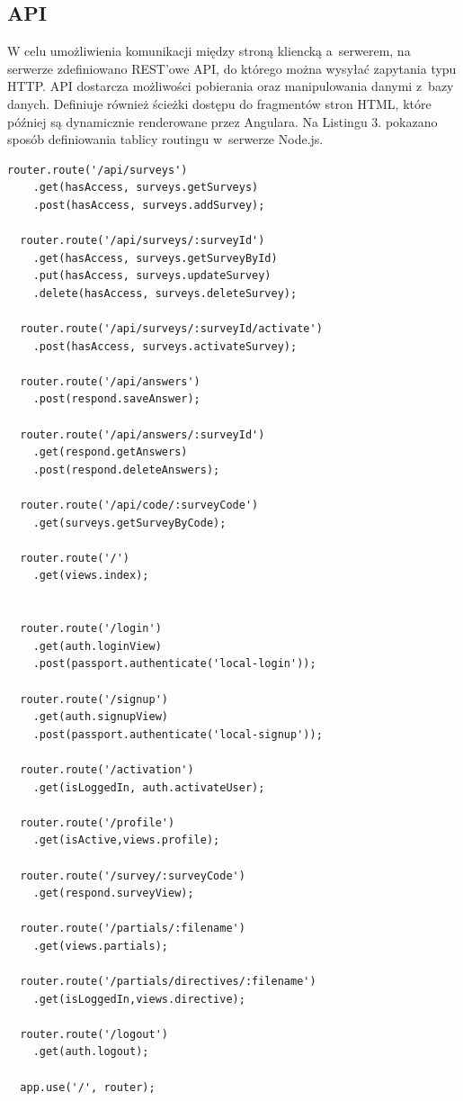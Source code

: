 \documentclass[12pt,a4paper,notitlepage]{article}
\begin{document}
\subsection{API}
W celu umożliwienia komunikacji między stroną kliencką a~serwerem, na serwerze zdefiniowano REST'owe API, do którego można wysyłać zapytania typu HTTP. API dostarcza możliwości pobierania oraz manipulowania danymi z~bazy danych. Definiuje również ścieżki dostępu do fragmentów stron HTML, które później są dynamicznie renderowane przez Angulara. Na Listingu 3. pokazano sposób definiowania tablicy routingu w~serwerze Node.js.
\begin{lstlisting}[caption=Definicja routingu w~Node.js ]
  router.route('/api/surveys')
    .get(hasAccess, surveys.getSurveys)
    .post(hasAccess, surveys.addSurvey);

  router.route('/api/surveys/:surveyId')
    .get(hasAccess, surveys.getSurveyById)
    .put(hasAccess, surveys.updateSurvey)
    .delete(hasAccess, surveys.deleteSurvey);

  router.route('/api/surveys/:surveyId/activate')
    .post(hasAccess, surveys.activateSurvey);

  router.route('/api/answers')
    .post(respond.saveAnswer);

  router.route('/api/answers/:surveyId')
    .get(respond.getAnswers)
    .post(respond.deleteAnswers);

  router.route('/api/code/:surveyCode')
    .get(surveys.getSurveyByCode);

  router.route('/')
    .get(views.index);


  router.route('/login')
    .get(auth.loginView)
    .post(passport.authenticate('local-login'));

  router.route('/signup')
    .get(auth.signupView)
    .post(passport.authenticate('local-signup'));

  router.route('/activation')
    .get(isLoggedIn, auth.activateUser);

  router.route('/profile')
    .get(isActive,views.profile);

  router.route('/survey/:surveyCode')
    .get(respond.surveyView);

  router.route('/partials/:filename')
    .get(views.partials);

  router.route('/partials/directives/:filename')
    .get(isLoggedIn,views.directive);

  router.route('/logout')
    .get(auth.logout);

  app.use('/', router);
\end{lstlisting}
\end{document}
